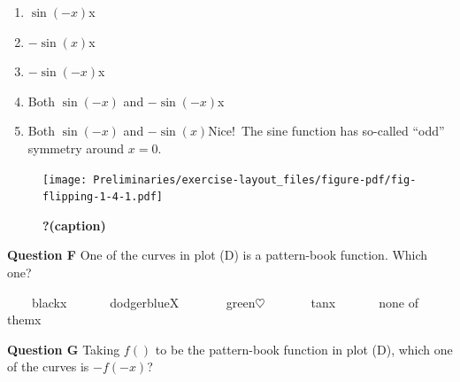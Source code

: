 \documentclass[
  letterpaper,
  DIV=11,
  numbers=noendperiod,
  oneside]{article}
\providecommand{\tightlist}{%
  \setlength{\itemsep}{0pt}\setlength{\parskip}{0pt}}\usepackage{longtable,booktabs,array}
\begin{document}
\begin{multicols}{2}
\begin{table}
\begin{minipage}[t]{\linewidth}
{\begin{enumerate}
\def\labelenumi{\roman{enumi}.}
\tightlist
\item
  {\(\sin(-x)\){x}}\\
\item
  {\(-\sin(x)\){x}}\\
\item
  {\(-\sin(-x)\){x}}\\
\item
  {Both \(\sin(-x)\) and \(-\sin(-x)\){x}}\\
\item
  {Both \(\sin(-x)\) and \(-\sin(x)\){Nice!~The sine function has
  so-called ``odd'' symmetry around \(x=0\).}}
\end{enumerate}

}

\end{minipage}%
\newline
\begin{minipage}[t]{\linewidth}

{\centering 

\begin{figure}

{\centering \texttt{[image: Preliminaries/exercise-layout\_files/figure-pdf/fig-flipping-1-4-1.pdf]}

}

\caption{\label{fig-flipping-1-4}\textbf{?(caption)}}

\end{figure}

}

\end{minipage}%
\newline
\begin{minipage}[t]{\linewidth}

{\centering 

\textbf{Question F} One of the curves in plot (D) is a pattern-book
function. Which one?

~~~~{black{x}}~~~~~~~{dodgerblue{︎X
}}~~~~~~~{green{\(\heartsuit\ \)}}~~~~~~~{tan{x}}~~~~~~~{none of
them{x}}

}

\end{minipage}%
\newline
\begin{minipage}[t]{\linewidth}

{\centering 

\textbf{Question G} Taking \(f()\) to be the pattern-book function in
plot (D), which one of the curves is \(-f(-x)\)?

}
\end{minipage}
\end{table}
\end{multicols}
\end{document}
